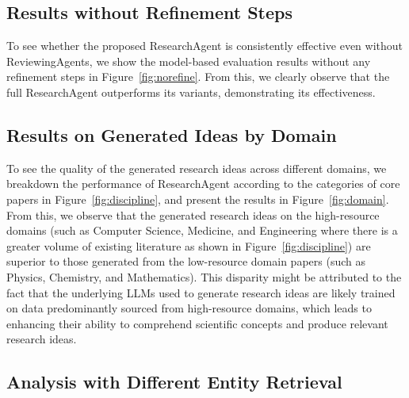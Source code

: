\subsection{Results without Refinement Steps}
To see whether the proposed ResearchAgent is consistently effective even without ReviewingAgents, we show the model-based evaluation results without any refinement steps in Figure~\ref{fig:norefine}. From this, we clearly observe that the full ResearchAgent outperforms its variants, demonstrating its effectiveness.



\subsection{Results on Generated Ideas by Domain}
To see the quality of the generated research ideas across different domains, we breakdown the performance of ResearchAgent according to the categories of core papers in Figure~\ref{fig:discipline}, and present the results in Figure~\ref{fig:domain}. From this, we observe that the generated research ideas on the high-resource domains (such as Computer Science, Medicine, and Engineering where there is a greater volume of existing literature as shown in Figure~\ref{fig:discipline}) are superior to those generated from the low-resource domain papers (such as Physics, Chemistry, and Mathematics). This disparity might be attributed to the fact that the underlying LLMs used to generate research ideas are likely trained on data predominantly sourced from high-resource domains, which leads to enhancing their ability to comprehend scientific concepts and produce relevant research ideas.



\subsection{Analysis with Different Entity Retrieval}
\label{appendix:retrieval}

